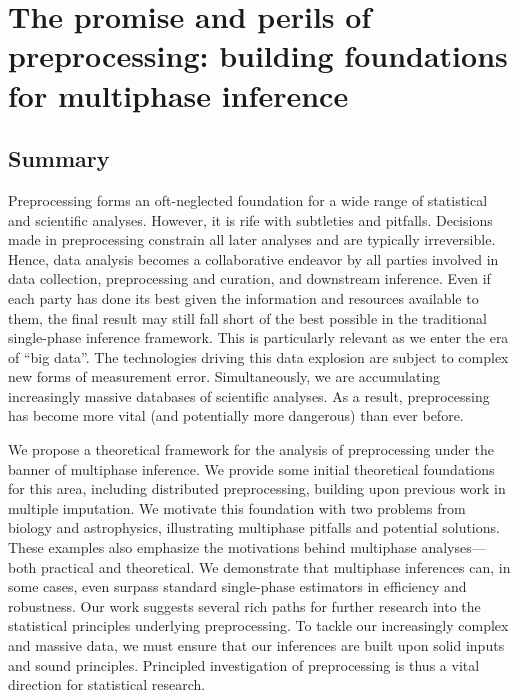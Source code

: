 

\chapter{The promise and perils of preprocessing: building foundations for multiphase inference}
\label{multiphase:ch:multiphase}

\section{Summary}

Preprocessing forms an oft-neglected foundation for a wide range of statistical and scientific analyses.
However, it is rife with subtleties and pitfalls.
Decisions made in preprocessing constrain all later analyses and are typically irreversible.
Hence, data analysis becomes a collaborative endeavor by all parties involved in data collection, preprocessing and curation, and downstream inference.
Even if each party has done its best given the information and resources available to them, the final result may still fall short of the best possible in the traditional single-phase inference framework.
This is particularly relevant as we enter the era of ``big data''.
The technologies driving this data explosion are subject to complex new forms of measurement error.
Simultaneously, we are accumulating increasingly massive databases of scientific analyses.
As a result, preprocessing has become more vital (and potentially more dangerous) than ever before.

We propose a theoretical framework for the analysis of preprocessing under the banner of multiphase inference.
We provide some initial theoretical foundations for this area, including distributed preprocessing, building upon previous work in multiple imputation.
We motivate this foundation with two problems from biology and astrophysics, illustrating multiphase pitfalls and potential solutions.
These examples also emphasize the motivations behind multiphase analyses---both practical and theoretical.
We demonstrate that multiphase inferences can, in some cases, even surpass standard single-phase estimators in efficiency and robustness.
Our work suggests several rich paths for further research into the statistical principles underlying preprocessing.
%
%
To tackle our increasingly complex and massive data, we must ensure that our inferences are built upon solid inputs and sound principles.
Principled investigation of preprocessing is thus a vital direction for statistical research.

